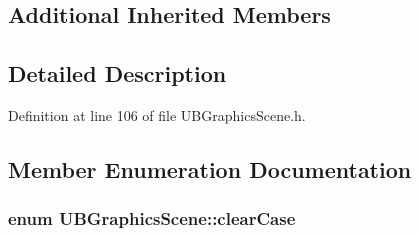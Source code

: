 \subsection*{Additional Inherited Members}


\subsection{Detailed Description}


Definition at line 106 of file U\-B\-Graphics\-Scene.\-h.



\subsection{Member Enumeration Documentation}
\hypertarget{class_u_b_graphics_scene_a35c5d1a0571964d92e864db92e29d5bd}{
\subsubsection[{clear\-Case}]{\setlength{\rightskip}{0pt plus 5cm}enum {\bf U\-B\-Graphics\-Scene\-::clear\-Case}}}\label{dc/db2/class_u_b_graphics_scene_a35c5d1a0571964d92e864db92e29d5bd}
